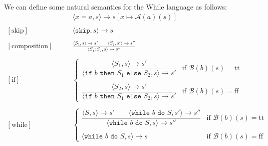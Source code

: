 \documentclass[a4paper, 12pt, twoside]{article}
\begin{document}
We can define some natural semantics for the While language as follows:
\begin{align*}
  [\text{assignment}]& \qquad \langle x=a, s \rangle \to s[x\mapsto \mathcal{A}(a)(s)] \\ \\
  [\text{skip}]& \qquad \langle \texttt{skip}, s \rangle \to s \\ \\
  [\text{composition}]& \qquad \frac{
    \langle S_1, s \rangle \to s' \qquad \langle S_2, s' \rangle \to s''
  }{\langle S_1;S_2, s \rangle \to s''} \\ \\
  [\text{if}]& \qquad \begin{cases}
    \dfrac{
      \langle S_1, s \rangle \to s'
    }{
      \langle \texttt{if } b \texttt{ then } S_1 \texttt{ else } S_2, s \rangle \to s'
    } & \text{if } \mathcal{B}(b)(s) = \text{tt} \\ \\
    \dfrac{
      \langle S_2, s \rangle \to s'
    }{
      \langle \texttt{if } b \texttt{ then } S_1 \texttt{ else } S_2, s \rangle \to s'
    } & \text{if } \mathcal{B}(b)(s) = \text{ff}
  \end{cases} \\ \\
  [\text{while}]& \qquad \begin{cases}
    \dfrac{
      \langle S, s \rangle \to s' \qquad \langle 
      \texttt{while } b \texttt{ do } S, s' \rangle \to s''
    }{
      \langle \texttt{while } b \texttt{ do } S, s \rangle \to s''
    } & \text{if } \mathcal{B}(b)(s) = \text{tt} \\ \\
    \langle \texttt{while } b \texttt{ do } S, s \rangle \to s
    & \text{if } \mathcal{B}(b)(s) = \text{ff}
  \end{cases}
\end{align*}
\end{document}
